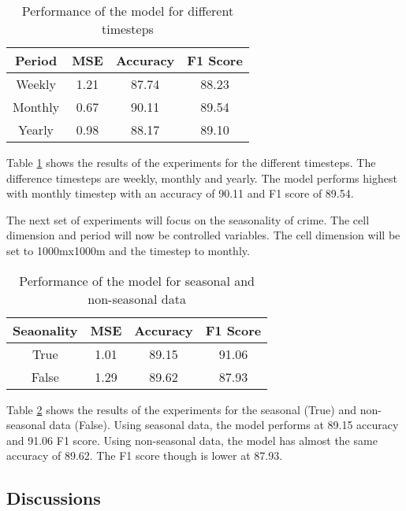     \begin{table}[H]
      \centering
      \begin{tabular}{|c|c|c|c|}
            \hline
          \textbf{Period}  &\textbf{MSE}  &\textbf{Accuracy} &\textbf{F1 Score}\\ 
          \hline
          Weekly &1.21 &87.74 &88.23 \\
          Monthly &0.67 &90.11 &89.54 \\
          Yearly   &0.98 &88.17 &89.10 \\
          \hline
        \end{tabular}
      \caption{Performance of the model for different timesteps}
      \label{table:timestep-results}
    \end{table}
    Table \ref{table:timestep-results} shows the results of the experiments for the different timesteps. The difference timesteps are weekly, monthly and yearly. The model performs highest with monthly timestep with an accuracy of 90.11 and F1 score of 89.54.

    The next set of experiments will focus on the seasonality of crime. The cell dimension and period will now be controlled variables. The cell dimension will be set to 1000mx1000m and the timestep to monthly.

    \begin{table}[H]
      \centering
      \begin{tabular}{|c|c|c|c|}
            \hline
          \textbf{Seaonality}  &\textbf{MSE}  &\textbf{Accuracy} &\textbf{F1 Score}\\ 
          \hline
          True &1.01 &89.15 &91.06\\
          False  &1.29 &89.62 &87.93 \\
          \hline
        \end{tabular}
      \caption{Performance of the model for seasonal and non-seasonal data}
      \label{table:seasonal-results}
    \end{table}
    Table \ref{table:seasonal-results} shows the results of the experiments for the seasonal (True) and non-seasonal data (False). Using seasonal data, the model performs at 89.15 accuracy and 91.06 F1 score. Using non-seasonal data, the model has almost the same accuracy of 89.62. The F1 score though is lower at 87.93.

\subsection{Discussions}

